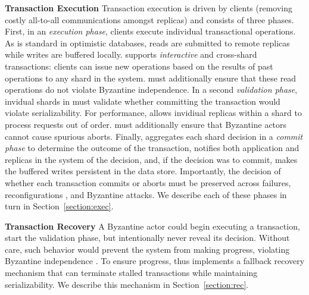 \par \textbf{Transaction Execution} Transaction execution is driven by clients (removing costly all-to-all communications amongst replicas) and consists of three phases. First, in an \textit{execution phase}, clients execute individual transactional operations. As is standard in optimistic databases, reads are submitted to remote replicas while writes are buffered locally. \sys{} supports \textit{interactive} and cross-shard transactions: clients can issue new operations based on the results of past operations to any shard in the system. \sys{} must additionally ensure that these read operations do not violate Byzantine independence. In a second \textit{validation phase}, invidual shards in \sys{} must validate whether committing the transaction would violate serializability. For performance, \sys{} allows invidiual replicas within a shard to process requests out of order. \sys{} must additionally ensure that Byzantine actors cannot cause spurious aborts. Finally, \sys{} aggregates each shard decision in a \textit{commit phase}  to determine the outcome of the transaction, notifies both application and replicas in the system of the decision, and, if the decision was to commit, makes the buffered writes persistent in the data store.  Importantly, the decision of whether each transaction commits or aborts must be preserved across failures, reconfigurations , and Byzantine attacks. We describe each of these phases in turn in Section~\ref{section:exec}.

\par \textbf{Transaction Recovery} A Byzantine actor could begin executing a transaction, start the validation phase, but intentionally never reveal its decision. Without care,
such behavior would prevent the system from making progress, violating Byzantine independence . To ensure progress, \sys{} thus implements a fallback recovery mechanism that can terminate stalled transactions while maintaining  serializability. We describe this mechanism in Section~\ref{section:rec}.





